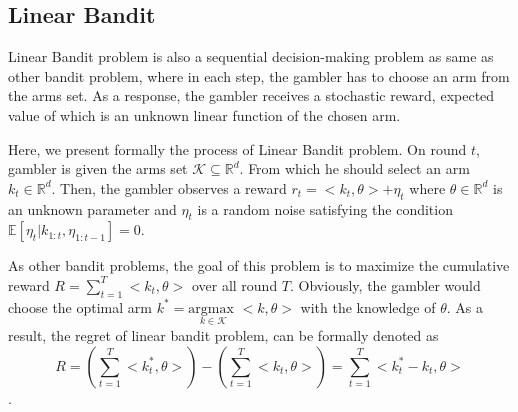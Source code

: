 \subsection{Linear Bandit}
\label{subsec:linear}
Linear Bandit problem\cite{abbasi2011improved, carpentier2012bandit} is also a sequential decision-making problem as same as other bandit problem, where in each step, the gambler has to choose an arm from the arms set. As a response, the gambler receives a stochastic reward, expected value of which is an unknown linear function of the chosen arm.

Here, we present formally the process of Linear Bandit problem. On round $t$, gambler is given the arms set $\mathscr{K} \subseteq \mathbb{R}^d$. From which he should select an arm $k_t\in\mathbb{R}^d$. Then, the gambler observes a reward $r_t = <k_t,\theta> + \eta_t$ where $\theta\in \mathbb{R}^d$ is an unknown parameter and $\eta_t$ is a random noise satisfying the condition $\mathbb{E}[\eta_t| k_{1:t}, \eta_{1:t-1}] = 0 $. 

As other bandit problems, the goal of this problem is to maximize the cumulative reward $R = \sum_{t=1}^T <k_t,\theta>$ over all round $T$. Obviously, the gambler would choose the optimal arm $k^{\ast} = \underset{k\in\mathscr{K}}{\text{argmax }}<k,\theta>$ with the knowledge of $\theta$. As a result, the regret of linear bandit problem, can be formally denoted as 
\[R = \left(\sum_{t=1}^T <k_t^{\ast},\theta>\right) - \left(\sum_{t=1}^T <k_t,\theta>\right) = \sum_{t=1}^T <k_t^{\ast}-k_t, \theta>\].
